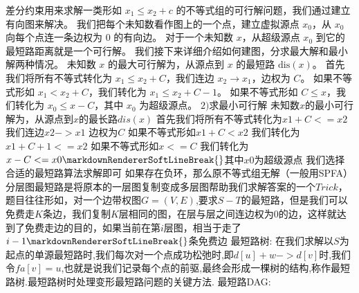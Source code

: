 {}差分约束用来求解一类形如 $x_1 \le x_2 + c$ 的不等式组的可行解问题，我们通过建立有向图来解决。\markdownRendererParagraphSeparator
{}我们把每个未知数看作图上的一个点，建立虚拟源点 $x_0$，从 $x_0$ 向每个点连一条边权为 $0$ 的有向边。\markdownRendererHardLineBreak
{}对于一个未知数 $x$，从超级源点 $x_0$ 到它的最短路距离就是一个可行解。\markdownRendererParagraphSeparator
{}我们接下来详细介绍如何建图，分求最大解和最小解两种情况。\markdownRendererParagraphSeparator
{}\markdownRendererHardLineBreak
{}未知数 $x$ 的最大可行解为，从源点到 $x$ 的最短路 $\mathrm{dis}(x)$。\markdownRendererHardLineBreak
{}首先我们将所有不等式转化为 $x_1 \le x_2 + C$，我们连边 $x_2 \to x_1$，边权为 $C$。\markdownRendererHardLineBreak
{}如果不等式形如 $x_1 < x_2 + C$，我们转化为 $x_1 \le x_2 + C - 1$。\markdownRendererHardLineBreak
{}如果不等式形如 $C \le x$，我们转化为 $x_0 \le x - C$，其中 $x_0$ 为超级源点。\markdownRendererParagraphSeparator
{}$ 2) $求最小可行解\markdownRendererParagraphSeparator
{}未知数$ x $的最小可行解为，从源点到$ x $的最长路$ dis(x) $\markdownRendererParagraphSeparator
{}首先我们将所有不等式转化为$ x1+C<=x2 $ 我们连边$ x2->x1 $ 边权为$ C $\markdownRendererParagraphSeparator
{}如果不等式形如$ x1+C<x2 $ 我们转化为$ x1+C+1<=x2 $\markdownRendererParagraphSeparator
{}如果不等式形如$ x<=C $ 我们转化为$ x-C<=x0\markdownRendererSoftLineBreak
{}$其中$ x0 $为超级源点\markdownRendererParagraphSeparator
{}我们选择合适的最短路算法求解即可 如果存在负环，那么原不等式组无解（一般用SPFA）\markdownRendererInterblockSeparator
{}
\markdownRendererSectionEnd \markdownRendererSectionBegin
{}\markdownRendererInterblockSeparator
{}分层图最短路是将原本的一层图复制变成多层图帮助我们求解答案的一个$ Trick $，题目往往形如，对一个边带权图$ G=(V,E) $,要求$ S-T $的最短路，但是我们可以免费走$ K $条边，我们复制$ K $层相同的图，在层与层之间连边权为$ 0 $的边，这样就达到了免费走边的目的，如果当前在第$ i $层图，相当于走了$ i-1\markdownRendererSoftLineBreak
{}$条免费边\markdownRendererInterblockSeparator
{}
\markdownRendererSectionEnd \markdownRendererSectionBegin
{}\markdownRendererInterblockSeparator
{}最短路树:\markdownRendererParagraphSeparator
{}在我们求解以$ S $为起点的单源最短路时,我们每次对一个点成功松弛时,即$ d[u]+w->d[v] $时,我们令$ fa[v]=u $,也就是说我们记录每个点的前驱,最终会形成一棵树的结构,称作最短路树.最短路树时处理变形最短路问题的关键方法.\markdownRendererParagraphSeparator
{}最短路DAG:\markdownRendererParagraphSeparator
